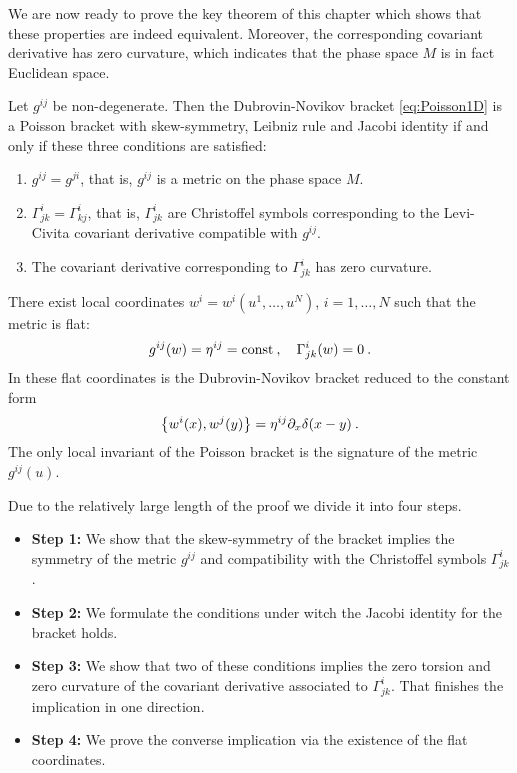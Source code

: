 We are now ready to prove the key theorem of this chapter which shows that these properties are indeed equivalent. Moreover, the corresponding covariant derivative has zero curvature, which indicates that the phase space $M$ is in fact Euclidean space.

\begin{theorem} \label{Theorem-Dubrovin-Novikov-1D}
    Let $g^{ij}$ be non-degenerate. Then the Dubrovin-Novikov bracket \eqref{eq:Poisson1D} is a Poisson bracket with skew-symmetry, Leibniz rule and Jacobi identity if and only if these three conditions are satisfied:
    \begin{enumerate}
        \item $g^{ij} = g^{ji}$, that is, $g^{ij}$ is a metric on the phase space $M$.
        \item $\Gamma^{i}_{jk} = \Gamma^i_{kj}$, that is, $\Gamma^{i}_{jk}$ are Christoffel symbols corresponding to the Levi-Civita covariant derivative compatible with $g^{ij}$.
        \item The covariant derivative corresponding to $\Gamma^{i}_{jk}$ has zero curvature.
    \end{enumerate}
\end{theorem}

\begin{corollary} \label{Corollary: existence of flat coordinates}
    There exist local coordinates $w^i = w^i(u^1, \dots, u^N)$, $i = 1, \dots, N$ such that the metric is flat:
    \begin{align}
        g^{ij}(w) = \eta^{ij} = \mathrm{const} \:, \quad \Gamma^i_{jk} (w) = 0 \:.
    \end{align}
    In these flat coordinates is the Dubrovin-Novikov bracket reduced to the constant form
    \begin{align}
        \left \lbrace w^i(x),w^j(y) \right \rbrace = \eta^{ij} \partial_x \delta(x-y) \:.
    \end{align}
    The only local invariant of the Poisson bracket is the signature of the metric $g^{ij}(u)$.
\end{corollary}

Due to the relatively large length of the proof we divide it into four steps.
\begin{itemize}
    \item \textbf{Step 1:} We show that the skew-symmetry of the bracket implies the symmetry of the metric $g^{ij}$ and compatibility with the Christoffel symbols $\Gamma^i_{jk}$.
    \item \textbf{Step 2:} We formulate the conditions under witch the Jacobi identity for the bracket holds.
    \item \textbf{Step 3:} We show that two of these conditions implies the zero torsion and zero curvature of the covariant derivative associated to $\Gamma^i_{jk}$. That finishes the implication in one direction.
    \item \textbf{Step 4:} We prove the converse implication via the existence of the flat coordinates.
\end{itemize}

